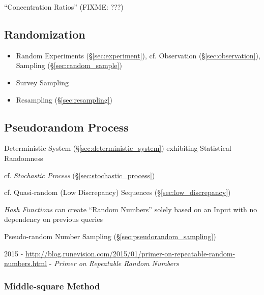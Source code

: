 ``Concentration Ratios'' (FIXME: ???)



\subsection{Randomization}\label{sec:randomization}

\begin{itemize}
  \item Random Experiments (\S\ref{sec:experiment}), cf. Observation
    (\S\ref{sec:observation}), Sampling (\S\ref{sec:random_sample})
  \item Survey Sampling
  \item Resampling (\S\ref{sec:resampling})
\end{itemize}



\subsection{Pseudorandom Process}\label{sec:pseudorandom_process}

Deterministic System (\S\ref{sec:deterministic_system}) exhibiting Statistical
Randomness

cf. \emph{Stochastic Process} (\S\ref{sec:stochastic_process})

cf. Quasi-random (Low Discrepancy) Sequences (\S\ref{sec:low_discrepancy})

\emph{Hash Functions} can create ``Random Numbers'' solely based on an Input
with no dependency on previous queries

\fist Pseudo-random Number Sampling (\S\ref{sec:pseudorandom_sampling})

2015 -
\url{http://blog.runevision.com/2015/01/primer-on-repeatable-random-numbers.html}
- \emph{Primer on Repeatable Random Numbers}



\subsubsection{Middle-square Method}\label{sec:middle_square_method}



